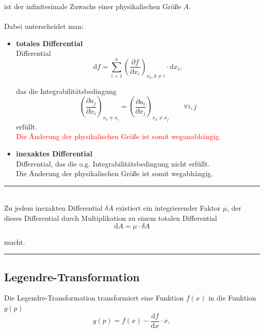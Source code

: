 \documentclass{article}
\newcommand{\diff}{\mathrm{d}}
\newcommand{\lr}[1]{\left(#1\right)}
\begin{document}
ist der infinitesimale Zuwachs einer physikalischen Größe $A$.\\
\\
Dabei unterscheidet man:
	\begin{itemize}
		\item \textbf{totales Differential}\\
		Differential
			\begin{equation}
				\diff f = \sum_{i=1}^n \lr{ \frac{ \partial f }{ \partial x_i } }_{ x_k, k \neq i }  \cdot \diff x_i,
			\end{equation}
	
	das die Integrabilitätsbedingung
			\begin{equation}
				\lr{ \frac{ \partial a_j }{ \partial x_i } }_{x_k\neq x_i} = \lr{ \frac{ \partial a_i }{ \partial x_j } }_{x_k\neq x_j} \qquad \forall i,j
			\end{equation}
		erfüllt.\\
		\textcolor{red}{Die Änderung der physikalischen Größe ist somit wegunabhängig.}
		
		
		\item \textbf{inexaktes Differential}\\
		Differential, das die o.g. Integrabilitätsbedingung nicht erfüllt.\\
		Die Änderung der physikalischen Größe ist somit wegabhängig.
	\end{itemize}

\vspace{0.5cm}

\hrule
	\\
	Zu jedem inexakten Differential $\delta A$ existiert ein integrierender Faktor $\mu$, der dieses Differential durch Multiplikation zu einem totalen Differential 
		\begin{equation}
			\diff A = \mu \cdot \delta A
		\end{equation}

	macht.
\hrule


\newpage


\subsection{Legendre-Transformation}
Die Legendre-Transformation transformiert eine Funktion $f(x)$ in die Funktion $g(p)$
	\begin{equation}
		g(p) = f(x) - \frac{\diff f}{\diff x}\cdot x,
	\end{equation}
\end{document}
